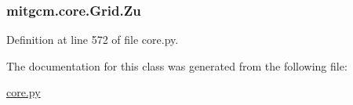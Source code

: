 \hypertarget{classmitgcm_1_1core_1_1Grid_a997f5082eb939242633601aa45a28744}{
\subsubsection[{Zu}]{\setlength{\rightskip}{0pt plus 5cm}mitgcm.\+core.\+Grid.\+Zu}}\label{classmitgcm_1_1core_1_1Grid_a997f5082eb939242633601aa45a28744}


Definition at line 572 of file core.\+py.



The documentation for this class was generated from the following file\+:\begin{DoxyCompactItemize}
\item 
\hyperlink{core_8py}{core.\+py}\end{DoxyCompactItemize}
